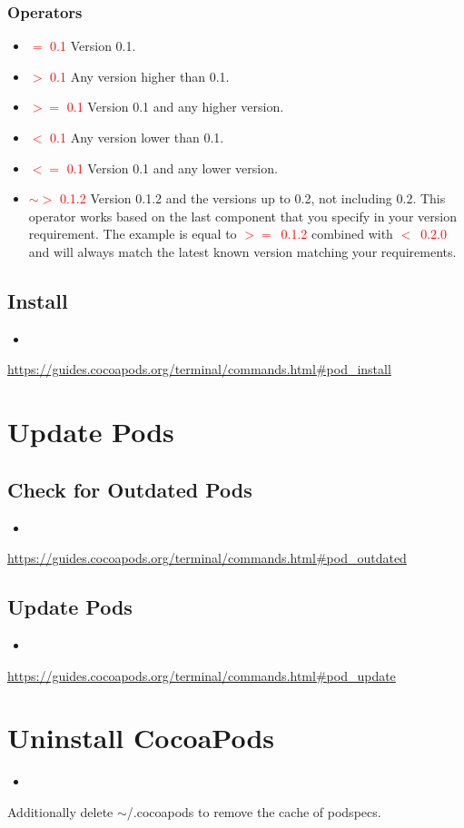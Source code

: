\documentclass[a4paper, twocolumn]{article}
\newcommand{\insertshellcode}[2]{\begin{itemize}\item[]\end{itemize}} %
\begin{document}
\subsubsection{Operators}
\begin{itemize}
	\item \textcolor{red}{$=$ 0.1} Version 0.1.
	\item \textcolor{red}{$>$ 0.1} Any version higher than 0.1.
	\item \textcolor{red}{$>=$ 0.1} Version 0.1 and any higher version.
	\item \textcolor{red}{$<$ 0.1} Any version lower than 0.1.
	\item \textcolor{red}{$<=$ 0.1} Version 0.1 and any lower version.
	\item \textcolor{red}{$\sim>$ 0.1.2} Version 0.1.2 and the versions up to 0.2, not including 0.2. This operator works based on the last component that you specify in your version requirement. The example is equal to \textcolor{red}{$>=$~0.1.2} combined with \textcolor{red}{$<$~0.2.0} and will always match the latest known version matching your requirements.
\end{itemize}
\subsection{Install}
\insertshellcode{"Scripts/installPods.txt"}{} %
\url{https://guides.cocoapods.org/terminal/commands.html#pod_install}

\section{Update Pods}
\subsection{Check for Outdated Pods}
\insertshellcode{"Scripts/outdatedPods.txt"}{} %
\url{https://guides.cocoapods.org/terminal/commands.html#pod_outdated}
\subsection{Update Pods}
\insertshellcode{"Scripts/updatePods.txt"}{} %
\url{https://guides.cocoapods.org/terminal/commands.html#pod_update}

\section{Uninstall CocoaPods}
\insertshellcode{"Scripts/uninstallCocoaPods.txt"}{} %
Additionally delete $\sim$/.cocoapods to remove the cache of podspecs.
\end{document}
